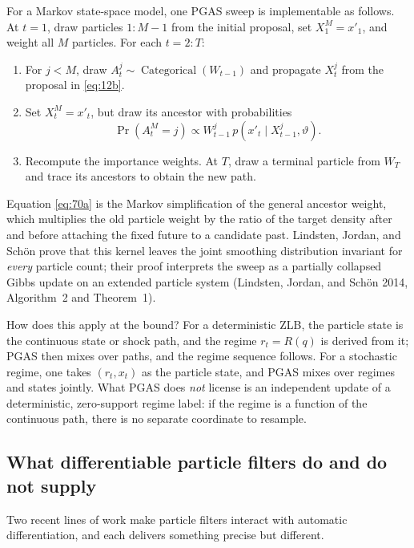 \documentclass[11pt]{article}
\begin{document}
For a Markov state-space model, one PGAS sweep is implementable as follows. At
$t=1$, draw particles $1{:}M-1$ from the initial proposal, set $X_1^M=x'_1$,
and weight all $M$ particles. For each $t=2{:}T$:
\begin{enumerate}
\item For $j<M$, draw $A_t^j\sim\operatorname{Categorical}(W_{t-1})$ and
      propagate $X_t^j$ from the proposal in \eqref{eq:12b}.
\item Set $X_t^M=x'_t$, but draw its ancestor with probabilities
\begin{equation}\label{eq:70a}
 \Pr(A_t^M=j)\propto W_{t-1}^j\,
 p(x'_t\mid X_{t-1}^j,\vartheta).
\end{equation}
\item Recompute the importance weights. At $T$, draw a terminal particle from
      $W_T$ and trace its ancestors to obtain the new path.
\end{enumerate}
Equation \eqref{eq:70a} is the Markov simplification of the general ancestor
weight, which multiplies the old particle weight by the ratio of the target
density after and before attaching the fixed future to a candidate past.
Lindsten, Jordan, and Sch\"on prove that this kernel leaves the joint smoothing
distribution invariant for \emph{every} particle count; their proof interprets
the sweep as a partially collapsed Gibbs update on an extended particle system
(Lindsten, Jordan, and Sch\"on 2014, Algorithm~2 and Theorem~1).

How does this apply at the bound? For a deterministic ZLB, the particle state
is the continuous state or shock path, and the regime $r_t=R(q)$ is derived
from it; PGAS then mixes over paths, and the regime sequence follows. For a
stochastic regime, one takes $(r_t,x_t)$ as the particle state, and PGAS mixes
over regimes and states jointly. What PGAS does \emph{not} license is an
independent update of a deterministic, zero-support regime label: if the regime
is a function of the continuous path, there is no separate coordinate to
resample.

\subsection{What differentiable particle filters do and do not supply}\label{sec:dpf}

Two recent lines of work make particle filters interact with automatic
differentiation, and each delivers something precise but different.
\end{document}
